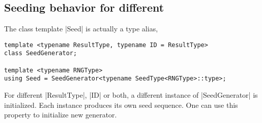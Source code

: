 \subsection{Seeding behavior for different \texorpdfstring{\rng}{RNG}}
\label{sub:Seeding behavior for different RNG}

The class template |Seed| is actually a type alias,
\begin{verbatim}
template <typename ResultType, typename ID = ResultType>
class SeedGenerator;

template <typename RNGType>
using Seed = SeedGenerator<typename SeedType<RNGType>::type>;
\end{verbatim}
For different |ResultType|, |ID| or both, a different instance of
|SeedGenerator| is initialized. Each instance produces its own seed sequence.
One can use this property to initialize new generator.

